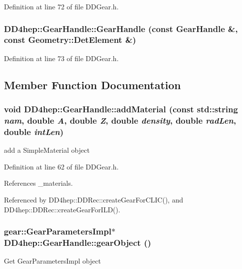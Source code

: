 Definition at line 72 of file DDGear.h.\hypertarget{class_d_d4hep_1_1_gear_handle_a7b88ea01bf9e0fb58e7df2997c8825fb}{
\subsubsection[{GearHandle}]{\setlength{\rightskip}{0pt plus 5cm}DD4hep::GearHandle::GearHandle (const {\bf GearHandle} \&, \/  const {\bf Geometry::DetElement} \&)}}
\label{class_d_d4hep_1_1_gear_handle_a7b88ea01bf9e0fb58e7df2997c8825fb}


Definition at line 73 of file DDGear.h.

\subsection{Member Function Documentation}
\hypertarget{class_d_d4hep_1_1_gear_handle_ae5f3ea169e473f5f0bd46f8d27d5d170}{
\subsubsection[{addMaterial}]{\setlength{\rightskip}{0pt plus 5cm}void DD4hep::GearHandle::addMaterial (const std::string {\em nam}, \/  double {\em A}, \/  double {\em Z}, \/  double {\em density}, \/  double {\em radLen}, \/  double {\em intLen})}}
\label{class_d_d4hep_1_1_gear_handle_ae5f3ea169e473f5f0bd46f8d27d5d170}


add a SimpleMaterial object 

Definition at line 62 of file DDGear.h.

References \_\-materials.

Referenced by DD4hep::DDRec::createGearForCLIC(), and DD4hep::DDRec::createGearForILD().\hypertarget{class_d_d4hep_1_1_gear_handle_aaa9e8fbe619ab3a1a45fac04773e6c9a}{
\subsubsection[{gearObject}]{\setlength{\rightskip}{0pt plus 5cm}gear::GearParametersImpl$\ast$ DD4hep::GearHandle::gearObject ()}}
\label{class_d_d4hep_1_1_gear_handle_aaa9e8fbe619ab3a1a45fac04773e6c9a}
Get GearParametersImpl object 

